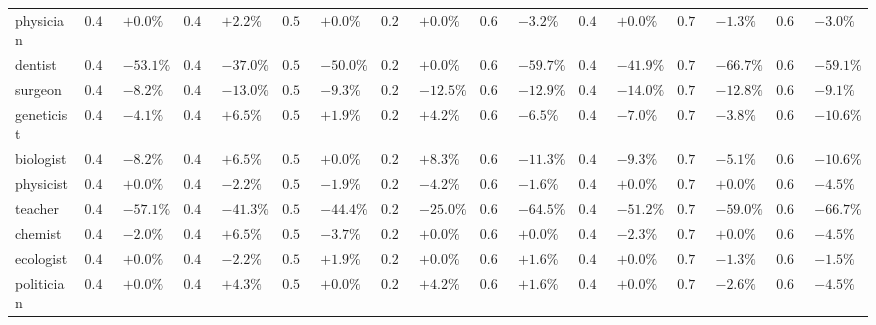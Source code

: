 \begin{table*}[ht]
{{\begin{tabular}{l|ll|ll|ll|ll|ll|ll|ll|ll}
\cellcolor{medicine!50} physician & $ 0.49 $ & $ +0.0\% $ & $ 0.46 $ & $ +2.2\% $ & $ 0.54 $ & $ +0.0\% $ & $ 0.24 $ & $ +0.0\% $ & $ 0.62 $ & \cellcolor{red!14} $ -3.2\% $ & $ 0.43 $ & $ +0.0\% $ & $ 0.78 $ & $ -1.3\% $ & $ 0.66 $ & $ -3.0\% $ \\
\cellcolor{medicine!50} dentist & $ 0.49 $ & $ -53.1\% $ & $ 0.46 $ & $ -37.0\% $ & $ 0.54 $ & $ -50.0\% $ & $ 0.24 $ & $ +0.0\% $ & $ 0.62 $ & \cellcolor{red!41} $ -59.7\% $ & $ 0.43 $ & $ -41.9\% $ & $ 0.78 $ & $ -66.7\% $ & $ 0.66 $ & $ -59.1\% $ \\
\cellcolor{medicine!50} surgeon & $ 0.49 $ & $ -8.2\% $ & $ 0.46 $ & $ -13.0\% $ & $ 0.54 $ & $ -9.3\% $ & $ 0.24 $ & $ -12.5\% $ & $ 0.62 $ & \cellcolor{red!26} $ -12.9\% $ & $ 0.43 $ & $ -14.0\% $ & $ 0.78 $ & $ -12.8\% $ & $ 0.66 $ & $ -9.1\% $ \\
\midrule
\cellcolor{natural!50} geneticist & $ 0.49 $ & $ -4.1\% $ & $ 0.46 $ & $ +6.5\% $ & $ 0.54 $ & $ +1.9\% $ & $ 0.24 $ & $ +4.2\% $ & $ 0.62 $ & $ -6.5\% $ & $ 0.43 $ & \cellcolor{red!20} $ -7.0\% $ & $ 0.78 $ & $ -3.8\% $ & $ 0.66 $ & $ -10.6\% $ \\
\cellcolor{natural!50} biologist & $ 0.49 $ & $ -8.2\% $ & $ 0.46 $ & $ +6.5\% $ & $ 0.54 $ & $ +0.0\% $ & $ 0.24 $ & $ +8.3\% $ & $ 0.62 $ & $ -11.3\% $ & $ 0.43 $ & \cellcolor{red!23} $ -9.3\% $ & $ 0.78 $ & $ -5.1\% $ & $ 0.66 $ & $ -10.6\% $ \\
\cellcolor{natural!50} physicist & $ 0.49 $ & $ +0.0\% $ & $ 0.46 $ & $ -2.2\% $ & $ 0.54 $ & $ -1.9\% $ & $ 0.24 $ & $ -4.2\% $ & $ 0.62 $ & $ -1.6\% $ & $ 0.43 $ &  $ +0.0\% $ & $ 0.78 $ & $ +0.0\% $ & $ 0.66 $ & $ -4.5\% $ \\
\cellcolor{natural!50} teacher & $ 0.49 $ & $ -57.1\% $ & $ 0.46 $ & $ -41.3\% $ & $ 0.54 $ & $ -44.4\% $ & $ 0.24 $ & $ -25.0\% $ & $ 0.62 $ & $ -64.5\% $ & $ 0.43 $ & \cellcolor{red!39} $ -51.2\% $ & $ 0.78 $ & $ -59.0\% $ & $ 0.66 $ & $ -66.7\% $ \\
\cellcolor{natural!50} chemist & $ 0.49 $ & $ -2.0\% $ & $ 0.46 $ & $ +6.5\% $ & $ 0.54 $ & $ -3.7\% $ & $ 0.24 $ & $ +0.0\% $ & $ 0.62 $ & $ +0.0\% $ & $ 0.43 $ & \cellcolor{red!11} $ -2.3\% $ & $ 0.78 $ & $ +0.0\% $ & $ 0.66 $ & $ -4.5\% $ \\
\cellcolor{natural!50} ecologist & $ 0.49 $ & $ +0.0\% $ & $ 0.46 $ & $ -2.2\% $ & $ 0.54 $ & $ +1.9\% $ & $ 0.24 $ & $ +0.0\% $ & $ 0.62 $ & $ +1.6\% $ & $ 0.43 $ &  $ +0.0\% $ & $ 0.78 $ & $ -1.3\% $ & $ 0.66 $ & $ -1.5\% $ \\
\midrule
\cellcolor{politics!50} politician & $ 0.49 $ & $ +0.0\% $ & $ 0.46 $ & $ +4.3\% $ & $ 0.54 $ & $ +0.0\% $ & $ 0.24 $ & $ +4.2\% $ & $ 0.62 $ & $ +1.6\% $ & $ 0.43 $ & $ +0.0\% $ & $ 0.78 $ & \cellcolor{red!12} $ -2.6\% $ & $ 0.66 $ & $ -4.5\% $ \\

\end{tabular}}}
\end{table*}
